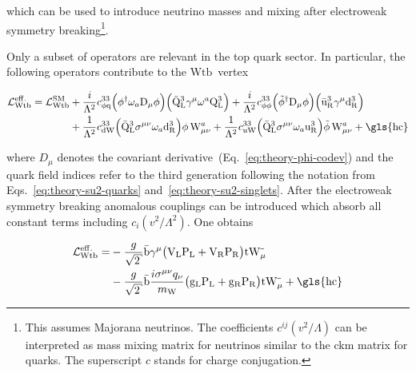 which can be used to introduce neutrino masses and mixing after electroweak symmetry breaking\footnote{This assumes Majorana neutrinos. The coefficients $c^{ij}(v^2/\Lambda)$ can be interpreted as mass mixing matrix for neutrinos similar to the \gls{ckm} matrix for quarks. The superscript $c$ stands for charge conjugation.}.

Only a subset of operators are relevant in the top quark sector. In particular, the following operators contribute to the $\mathrm{Wtb}$~vertex

\begin{align}
\mathcal{L}^\mathrm{eff.}_\mathrm{Wtb}=\mathcal{L}^\mathrm{SM}_\mathrm{Wtb}&+\frac{i}{\Lambda^2}c_{\phi\mathrm{q}}^{33}\Big(\phi^\dagger\omega_{a}\mathrm{D}_\mu\phi\Big)\Big(\bar{\mathrm{Q}}_\mathrm{L}^{3}\gamma^{\mu}\omega^{a}\mathrm{Q}_\mathrm{L}^{3}\Big)+\frac{i}{\Lambda^2}c_{\phi\phi}^{33}\Big(\tilde{\phi}^\dagger\mathrm{D}_\mu\phi\Big)\Big(\bar{\mathrm{u}}_\mathrm{R}^{3}\gamma^{\mu}\mathrm{d}_\mathrm{R}^{3}\Big) \nonumber\\
&+\frac{1}{\Lambda^2}c_{\mathrm{dW}}^{33}\Big(\bar{\mathrm{Q}}_\mathrm{L}^{3}\sigma^{\mu\nu}\omega_{a}\mathrm{d}_\mathrm{R}^{3}\Big)\phi\,\mathrm{W}^{a}_{\mu\nu}+\frac{1}{\Lambda^2}c_{\mathrm{uW}}^{33}\Big(\bar{\mathrm{Q}}_\mathrm{L}^{3}\sigma^{\mu\nu}\omega_{a}\mathrm{u}_\mathrm{R}^{3}\Big)\tilde{\phi}\,\mathrm{W}^{a}_{\mu\nu}+\mathrm{\gls{hc}} \label{eq:theory-eft-lagrangian-operators}
\end{align}

where $D_\mu$ denotes the covariant derivative~(Eq.~\ref{eq:theory-phi-codev}) and the quark field indices refer to the third generation following the notation from Eqs.~\ref{eq:theory-su2-quarks} and~\ref{eq:theory-su2-singlets}. After the electroweak symmetry breaking anomalous couplings can be introduced which absorb all constant terms including $c_{i}(v^2/\Lambda^2)$. One obtains

\begin{align}
\mathcal{L}^\mathrm{eff.}_\mathrm{Wtb}=&-\frac{g}{\sqrt{2}}\bar{\mathrm{b}}\gamma^{\mu}\big(\mathrm{V}_\mathrm{L}\mathrm{P}_\mathrm{L}+\mathrm{V}_\mathrm{R}\mathrm{P}_\mathrm{R}\big)\mathrm{t}\mathrm{W}_\mu^{\rmminus}\\
&-\frac{g}{\sqrt{2}}\bar{\mathrm{b}}\frac{i\sigma^{\mu\nu}q_\nu}{m_\mathrm{W}}\big(\mathrm{g}_\mathrm{L}\mathrm{P}_\mathrm{L}+\mathrm{g}_\mathrm{R}\mathrm{P}_\mathrm{R}\big)\mathrm{t}\mathrm{W}_\mu^{\rmminus}+\mathrm{\gls{hc}}
\end{align}

